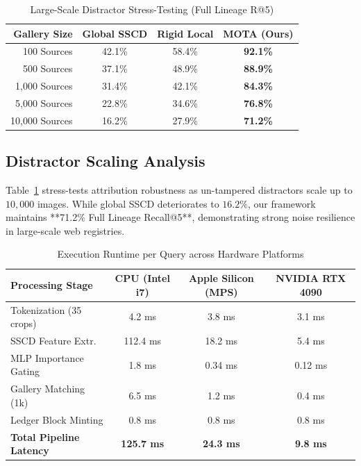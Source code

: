 \documentclass[journal]{IEEEtran}
\begin{document}
\begin{table}[t]
\centering
\caption{Large-Scale Distractor Stress-Testing (Full Lineage R@5)}
\label{tab:distractor_scaling}
\begin{tabular}{rccc}
\toprule
\textbf{Gallery Size} & \textbf{Global SSCD} & \textbf{Rigid Local} & \textbf{MOTA (Ours)} \\
\midrule
100 Sources & 42.1\% & 58.4\% & \textbf{92.1\%} \\
500 Sources & 37.1\% & 48.9\% & \textbf{88.9\%} \\
1,000 Sources & 31.4\% & 42.1\% & \textbf{84.3\%} \\
5,000 Sources & 22.8\% & 34.6\% & \textbf{76.8\%} \\
10,000 Sources & 16.2\% & 27.9\% & \textbf{71.2\%} \\
\bottomrule
\end{tabular}
\end{table}

\subsection{Distractor Scaling Analysis}
Table~\ref{tab:distractor_scaling} stress-tests attribution robustness as un-tampered distractors scale up to $10,000$ images. While global SSCD deteriorates to $16.2\%$, our framework maintains **71.2\% Full Lineage Recall@5**, demonstrating strong noise resilience in large-scale web registries.

\begin{table}[t]
\centering
\caption{Execution Runtime per Query across Hardware Platforms}
\label{tab:runtime}
\begin{tabular}{lccc}
\toprule
\textbf{Processing Stage} & \textbf{CPU (Intel i7)} & \textbf{Apple Silicon (MPS)} & \textbf{NVIDIA RTX 4090} \\
\midrule
Tokenization (35 crops) & 4.2 ms & 3.8 ms & 3.1 ms \\
SSCD Feature Extr. & 112.4 ms & 18.2 ms & 5.4 ms \\
MLP Importance Gating & 1.8 ms & 0.34 ms & 0.12 ms \\
Gallery Matching (1k) & 6.5 ms & 1.2 ms & 0.4 ms \\
Ledger Block Minting & 0.8 ms & 0.8 ms & 0.8 ms \\
\midrule
\textbf{Total Pipeline Latency} & \textbf{125.7 ms} & \textbf{24.3 ms} & \textbf{9.8 ms} \\
\bottomrule
\end{tabular}
\end{table}
\end{document}
